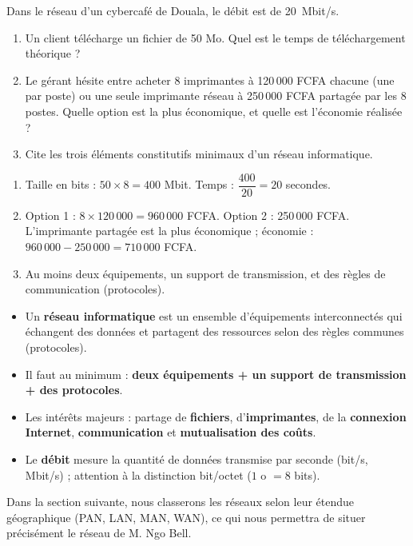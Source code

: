 \documentclass[11pt]{article}
\newcounter{popsec}
\newcounter{popsub}
\newcommand{\courssub}[1]{%
  \stepcounter{popsub}%
  \par\vspace{9pt}\noindent{\popxbold\fontsize{11.5}{13}\selectfont\color{popink}{\color{poporange}\thepopsec.\thepopsub}\hspace{6pt}#1}\par\nopagebreak\vspace{4pt}
}
\begin{document}
\courssub{Exercices d'application}

\begin{exercice}
Dans le réseau d'un cybercafé de Douala, le débit est de \SI{20}{Mbit/s}.
\begin{enumerate}
  \item Un client télécharge un fichier de 50 Mo. Quel est le temps de téléchargement théorique ?
  \item Le gérant hésite entre acheter 8 imprimantes à 120\,000 FCFA chacune (une par poste) ou une seule imprimante réseau à 250\,000 FCFA partagée par les 8 postes. Quelle option est la plus économique, et quelle est l'économie réalisée ?
  \item Cite les trois éléments constitutifs minimaux d'un réseau informatique.
\end{enumerate}
\end{exercice}

\begin{corrige}
\begin{enumerate}
  \item Taille en bits : $50 \times 8 = 400$ Mbit. Temps : $\dfrac{400}{20} = 20$ secondes.
  \item Option 1 : $8 \times 120\,000 = 960\,000$ FCFA. Option 2 : 250\,000 FCFA. L'imprimante partagée est la plus économique ; économie : $960\,000 - 250\,000 = 710\,000$ FCFA.
  \item Au moins deux équipements, un support de transmission, et des règles de communication (protocoles).
\end{enumerate}
\end{corrige}

\begin{aretenir}
\begin{itemize}
  \item Un \textbf{réseau informatique} est un ensemble d'équipements interconnectés qui échangent des données et partagent des ressources selon des règles communes (protocoles).
  \item Il faut au minimum : \textbf{deux équipements + un support de transmission + des protocoles}.
  \item Les intérêts majeurs : partage de \textbf{fichiers}, d'\textbf{imprimantes}, de la \textbf{connexion Internet}, \textbf{communication} et \textbf{mutualisation des coûts}.
  \item Le \textbf{débit} mesure la quantité de données transmise par seconde (bit/s, Mbit/s) ; attention à la distinction bit/octet ($1$ o $= 8$ bits).
\end{itemize}
Dans la section suivante, nous classerons les réseaux selon leur étendue géographique (PAN, LAN, MAN, WAN), ce qui nous permettra de situer précisément le réseau de M. Ngo Bell.
\end{aretenir}
\end{document}
